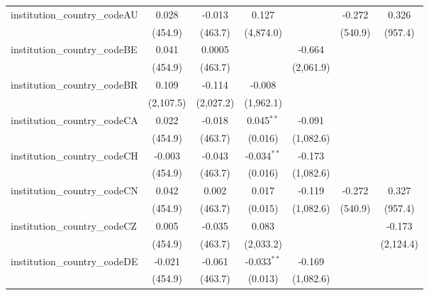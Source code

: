\begin{tabular}{lcccccc}
   institution\_country\_codeAU          & 0.028         & -0.013        & 0.127          &                & -0.272    & 0.326\\   
                                         & (454.9)       & (463.7)       & (4,874.0)      &                & (540.9)   & (957.4)\\   
   institution\_country\_codeBE          & 0.041         & 0.0005        &                & -0.664         &           &   \\   
                                         & (454.9)       & (463.7)       &                & (2,061.9)      &           &   \\   
   institution\_country\_codeBR          & 0.109         & -0.114        & -0.008         &                &           &   \\   
                                         & (2,107.5)     & (2,027.2)     & (1,962.1)      &                &           &   \\   
   institution\_country\_codeCA          & 0.022         & -0.018        & 0.045$^{**}$   & -0.091         &           &   \\   
                                         & (454.9)       & (463.7)       & (0.016)        & (1,082.6)      &           &   \\   
   institution\_country\_codeCH          & -0.003        & -0.043        & -0.034$^{**}$  & -0.173         &           &   \\   
                                         & (454.9)       & (463.7)       & (0.016)        & (1,082.6)      &           &   \\   
   institution\_country\_codeCN          & 0.042         & 0.002         & 0.017          & -0.119         & -0.272    & 0.327\\   
                                         & (454.9)       & (463.7)       & (0.015)        & (1,082.6)      & (540.9)   & (957.4)\\   
   institution\_country\_codeCZ          & 0.005         & -0.035        & 0.083          &                &           & -0.173\\   
                                         & (454.9)       & (463.7)       & (2,033.2)      &                &           & (2,124.4)\\   
   institution\_country\_codeDE          & -0.021        & -0.061        & -0.033$^{**}$  & -0.169         &           &   \\   
                                         & (454.9)       & (463.7)       & (0.013)        & (1,082.6)      &           &   \\   

\end{tabular}
